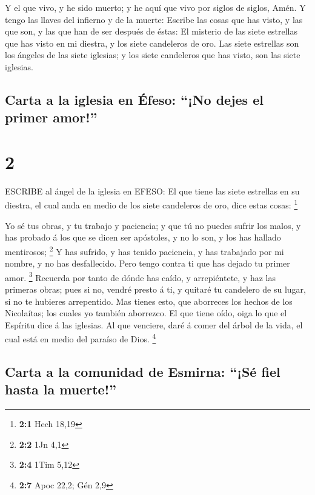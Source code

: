  Y el que vivo, y he sido muerto; y he aquí que vivo por
siglos de siglos, Amén. Y tengo las llaves del infierno y de la muerte:
 Escribe las cosas que has visto, y las que son, y las que
han de ser después de éstas:  El misterio de las siete
estrellas que has visto en mi diestra, y los siete candeleros de oro.
Las siete estrellas son los ángeles de las siete iglesias; y los siete
candeleros que has visto, son las siete iglesias.

\hypertarget{carta-a-la-iglesia-en-uxe9feso-no-dejes-el-primer-amor}{%
\subsection{Carta a la iglesia en Éfeso: ``¡No dejes el primer
amor!''}\label{carta-a-la-iglesia-en-uxe9feso-no-dejes-el-primer-amor}}

\hypertarget{section-1}{%
\section{2}\label{section-1}}

 ESCRIBE al ángel de la iglesia en EFESO: El que tiene las
siete estrellas en su diestra, el cual anda en medio de los siete
candeleros de oro, dice estas cosas: \footnote{\textbf{2:1} Hech 18,19}

 Yo sé tus obras, y tu trabajo y paciencia; y que tú no
puedes sufrir los malos, y has probado á los que se dicen ser apóstoles,
y no lo son, y los has hallado mentirosos; \footnote{\textbf{2:2} 1Jn
  4,1}  Y has sufrido, y has tenido paciencia, y has
trabajado por mi nombre, y no has desfallecido.  Pero tengo
contra ti que has dejado tu primer amor. \footnote{\textbf{2:4} 1Tim
  5,12}  Recuerda por tanto de dónde has caído, y
arrepiéntete, y haz las primeras obras; pues si no, vendré presto á ti,
y quitaré tu candelero de su lugar, si no te hubieres arrepentido.
 Mas tienes esto, que aborreces los hechos de los
Nicolaítas; los cuales yo también aborrezco.  El que tiene
oído, oiga lo que el Espíritu dice á las iglesias. Al que venciere, daré
á comer del árbol de la vida, el cual está en medio del paraíso de Dios.
\footnote{\textbf{2:7} Apoc 22,2; Gén 2,9}

\hypertarget{carta-a-la-comunidad-de-esmirna-suxe9-fiel-hasta-la-muerte}{%
\subsection{Carta a la comunidad de Esmirna: ``¡Sé fiel hasta la
muerte!''}\label{carta-a-la-comunidad-de-esmirna-suxe9-fiel-hasta-la-muerte}}

